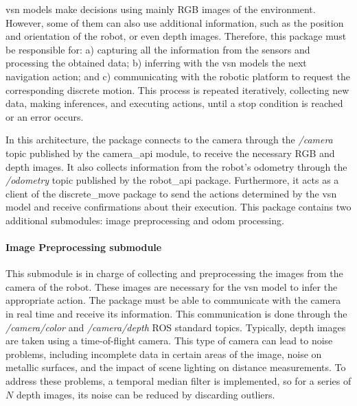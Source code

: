 \acrshort{vsn} models make decisions using mainly RGB images of the environment.
However, some of them can also use additional information, such as the position and orientation of the robot, or even depth images.
Therefore, this package must be responsible for: a) capturing all the information from the sensors and processing the obtained data; b) inferring with the \acrshort{vsn} models the next navigation action; and c) communicating with the robotic platform to request the corresponding discrete motion.
This process is repeated iteratively, collecting new data, making inferences, and executing actions, until a stop condition is reached or an error occurs.

In this architecture, the package connects to the camera through the \textit{/camera} topic published by the camera\_api module, to receive the necessary RGB and depth images.
It also collects information from the robot's odometry through the \textit{/odometry} topic published by the robot\_api package.
Furthermore, it acts as a client of the discrete\_move package to send the actions determined by the \acrshort{vsn} model and receive confirmations about their execution.
This package contains two additional submodules: image preprocessing and odom processing.




\paragraph*{Image Preprocessing submodule}\label{par:image-preprocessing}

This submodule is in charge of collecting and preprocessing the images from the camera of the robot.
These images are necessary for the \acrshort{vsn} model to infer the appropriate action.
The package must be able to communicate with the camera in real time and receive its information.
This communication is done through the \textit{/camera/color} and \textit{/camera/depth} ROS standard topics.
Typically, depth images are taken using a time-of-flight camera.
This type of camera can lead to noise problems, including incomplete data in certain areas of the image, noise on metallic surfaces, and the impact of scene lighting on distance measurements.
To address these problems, a temporal median filter is implemented, so for a series of $N$ depth images, its noise can be reduced by discarding outliers.

